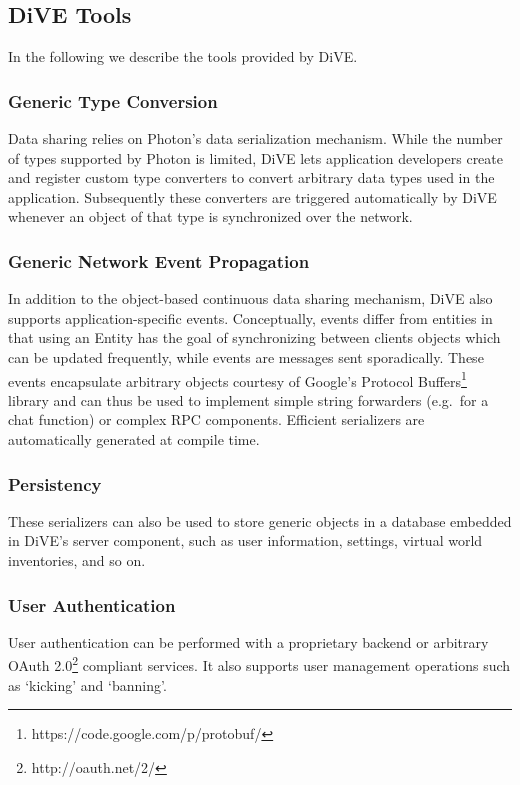 \documentclass[]{elsarticle}
\begin{document}
\subsection{DiVE Tools}

In the following we describe the tools provided by DiVE.


\subsubsection{Generic Type Conversion}

Data sharing relies on Photon's data serialization mechanism. While the number of types supported by Photon is limited, DiVE lets application developers create and register custom type converters to convert arbitrary data types used in the application. Subsequently these converters are triggered automatically by DiVE whenever an object of that type is synchronized over the network.

\subsubsection{Generic Network Event Propagation}

In addition to the object-based continuous data sharing mechanism, DiVE also supports application-specific events. Conceptually, events differ from entities in that using an Entity has the goal of synchronizing between clients objects which can be updated frequently, while events are messages sent sporadically. These events encapsulate arbitrary objects courtesy of Google's Protocol Buffers\footnote{https://code.google.com/p/protobuf/} library and can thus be used to implement simple string forwarders (e.g.~for a chat function) or complex RPC components. Efficient serializers are automatically generated at compile time.

\subsubsection{Persistency}
These serializers can also be used to store generic objects in a database embedded in DiVE's server component, such as user information, settings, virtual world inventories, and so on.

\subsubsection{User Authentication}

User authentication can be performed with a proprietary backend or arbitrary OAuth 2.0\footnote{http://oauth.net/2/} compliant services. It also supports user management operations such as `kicking' and `banning'.
\end{document}
